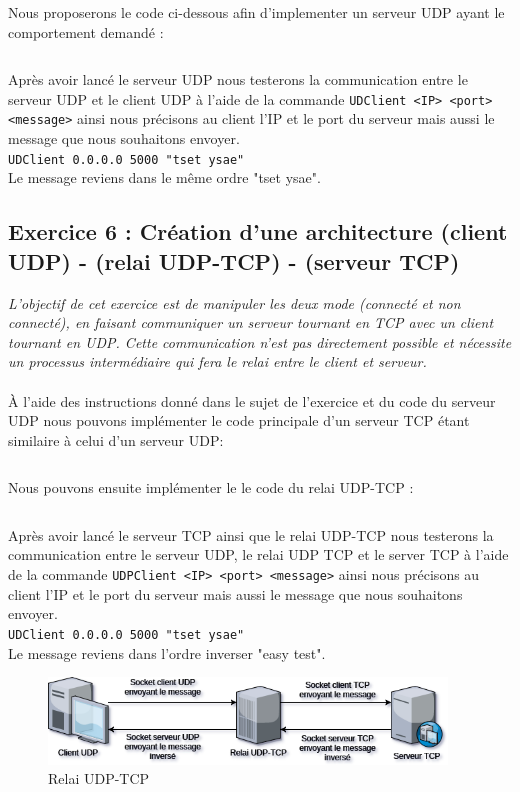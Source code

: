 Nous proposerons le code ci-dessous afin d'implementer un serveur UDP ayant le comportement demandé :
\inputminted[linenos,firstline=34,lastline=104]{cpp}{../sources/cpp/TP7-8/serveurUDP.c}

Après avoir lancé le serveur UDP nous testerons la communication entre le serveur UDP et le client UDP à l'aide de la commande \texttt{UDClient <IP> <port> <message>} ainsi nous précisons au client l'IP et le port du serveur mais aussi le message que nous souhaitons envoyer.\\
\texttt{UDClient 0.0.0.0 5000 "tset ysae"}\\
Le message reviens dans le même ordre "tset ysae".

\subsection{Exercice 6 : Création d’une architecture (client UDP) - (relai UDP-TCP) - (serveur TCP)}

\textit{L'objectif de cet exercice est de manipuler les deux mode (connecté et non connecté), en faisant communiquer un serveur tournant en TCP avec un client tournant en UDP. Cette communication n’est pas directement possible et nécessite un processus intermédiaire qui fera le relai entre le client et serveur.}
\\\\
À l'aide des instructions donné dans le sujet de l'exercice et du code du serveur UDP nous pouvons implémenter le code principale d'un serveur TCP étant similaire à celui d'un serveur UDP:
\inputminted[linenos, firstline=34,lastline=126]{cpp}{../sources/cpp/TP7-8/serveurTCP.c}

Nous pouvons ensuite implémenter le le code du relai UDP-TCP :
\inputminted[linenos, firstline=22,lastline=142]{cpp}{../sources/cpp/TP7-8/relaiUDPTCP.c}

Après avoir lancé le serveur TCP ainsi que le relai UDP-TCP nous testerons la communication entre le serveur UDP, le relai UDP TCP et le server TCP à l'aide de la commande \texttt{UDPClient <IP> <port> <message>} ainsi nous précisons au client l'IP et le port du serveur mais aussi le message que nous souhaitons envoyer.\\
\texttt{UDClient 0.0.0.0 5000 "tset ysae"}\\
Le message reviens dans l'ordre inverser "easy test".

\begin{figure}[H]
  \centering
  \includegraphics[width=300pt]{./cpp/Pictures/tp7+tp8-relay-UDP-TCP}
  \caption{Relai UDP-TCP}
  \label{Relai UDP-TCP}
\end{figure}

